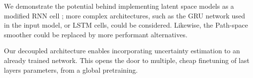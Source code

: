 \documentclass[journal]{IEEEtran}
\begin{document}
We demonstrate the potential behind implementing latent space models as a modified RNN cell ;
more complex architectures, such as the GRU network used in the input model, or LSTM cells, could be considered.
Likewise, the Path-space smoother could be replaced by more performant alternatives.

Our decoupled architecture enables incorporating uncertainty estimation to an already trained network.
This opens the door to multiple, cheap finetuning of last layers parameters, from a global pretraining.

\clearpage


\end{document}
